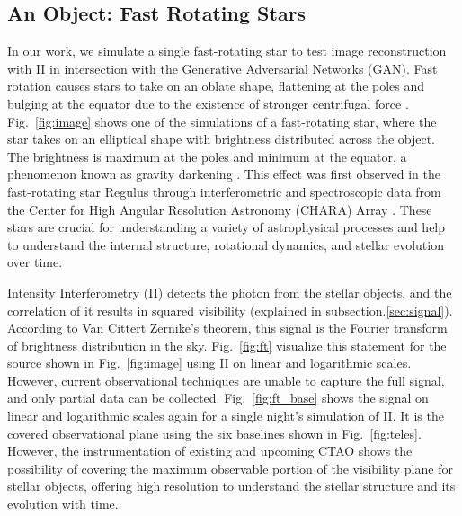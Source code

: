 \subsection{An Object: Fast Rotating Stars}
In our work, we simulate a single fast-rotating star to test image reconstruction with II in intersection with the Generative Adversarial Networks (GAN). Fast rotation causes stars to take on an oblate shape, flattening at the poles and bulging at the equator due to the existence of stronger centrifugal force \citep{von1924radiative, 1999A&A...347..185M}. Fig.~\ref{fig:image} shows one of the simulations of a fast-rotating star, where the star takes on an elliptical shape with brightness distributed across the object. The brightness is maximum at the poles and minimum at the equator, a phenomenon known as gravity darkening \citep{lucy1967gravity}. This effect was first observed in the fast-rotating star Regulus through interferometric and spectroscopic data from the Center for High Angular Resolution Astronomy (CHARA) Array \citep{mcalister2005first}. These stars are crucial for understanding a variety of astrophysical processes and help to understand the internal structure, rotational dynamics, and stellar evolution over time.

Intensity Interferometry (II) detects the photon from the stellar objects, and the correlation of it results in squared visibility (explained in subsection.\ref{sec:signal}). According to Van Cittert Zernike's theorem, this signal is the Fourier transform of brightness distribution in the sky. Fig.~\ref {fig:ft} visualize this statement for the source shown in Fig.~\ref{fig:image} using II on linear and logarithmic scales. However, current observational techniques are unable to capture the full signal, and only partial data can be collected. Fig.~\ref{fig:ft_base} shows the signal on linear and logarithmic scales again for a single night's simulation of II. It is the covered observational plane using the six baselines shown in Fig.~\ref{fig:teles}. However, the instrumentation of existing and upcoming CTAO shows the possibility of covering the maximum observable portion of the visibility plane for stellar objects, offering high resolution to understand the stellar structure and its evolution with time.